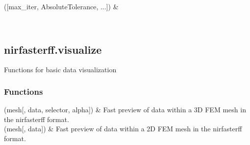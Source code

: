 \documentclass[letterpaper,10pt,english]{sphinxmanual}
\begin{document}
\begin{fulllineitems}
\begin{savenotes}\sphinxattablestart
\sphinxthistablewithglobalstyle
\sphinxthistablewithnovlinesstyle
\centering
\begin{tabulary}{\linewidth}[t]{}
\sphinxtoprule
\sphinxtableatstartofbodyhook
\sphinxAtStartPar
{\hyperref[\detokenize{_autosummary/nirfasterff.utils.SolverOptions:nirfasterff.utils.SolverOptions.__init__}]{}}({[}max\_iter, AbsoluteTolerance, ...{]})
&
\sphinxAtStartPar

\\
\sphinxbottomrule
\end{tabulary}
\sphinxtableafterendhook\par
\sphinxattableend\end{savenotes}

\end{fulllineitems}


\sphinxstepscope


\subsection{nirfasterff.visualize}
\label{\detokenize{_autosummary/nirfasterff.visualize:module-nirfasterff.visualize}}\label{\detokenize{_autosummary/nirfasterff.visualize:nirfasterff-visualize}}\label{\detokenize{_autosummary/nirfasterff.visualize::doc}}
\sphinxAtStartPar
Functions for basic data visualization
\subsubsection*{Functions}


\begin{savenotes}\sphinxattablestart
\sphinxthistablewithglobalstyle
\sphinxthistablewithnovlinesstyle
\centering
\begin{tabulary}{\linewidth}[t]{}
\sphinxtoprule
\sphinxtableatstartofbodyhook
\sphinxAtStartPar
{\hyperref[\detokenize{_autosummary/nirfasterff.visualize.plot3dmesh:nirfasterff.visualize.plot3dmesh}]{}}(mesh{[}, data, selector, alpha{]})
&
\sphinxAtStartPar
Fast preview of data within a 3D FEM mesh in the nirfasterff format.
\\
\sphinxhline
\sphinxAtStartPar
{\hyperref[\detokenize{_autosummary/nirfasterff.visualize.plotimage:nirfasterff.visualize.plotimage}]{}}(mesh{[}, data{]})
&
\sphinxAtStartPar
Fast preview of data within a 2D FEM mesh in the nirfasterff format.
\\
\sphinxbottomrule
\end{tabulary}
\sphinxtableafterendhook\par
\sphinxattableend\end{savenotes}
\end{document}

